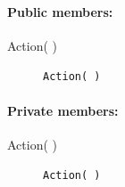 \paragraph{Public members:}
\begin{adjustwidth}{2.5em}{0pt}\begin{description}
		\item [Action( )] \texttt{Action( )} 
\end{description}\end{adjustwidth}

\paragraph{Private members:}
\begin{adjustwidth}{2.5em}{0pt}\begin{description}
		\item [Action( )] \texttt{Action( )}
\end{description}\end{adjustwidth}
